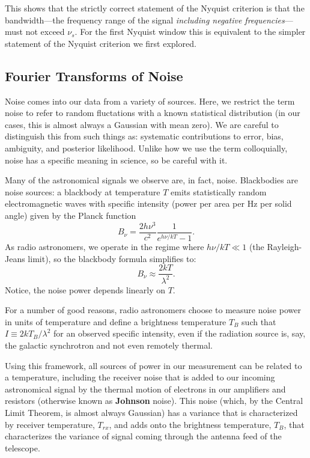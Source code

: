 \documentclass[12pt,preprint]{aastex}
\begin{document}
This shows that the strictly correct statement of the Nyquist criterion
is that the bandwidth---the frequency range of the
signal {\it including negative frequencies}---must not exceed $\nu_s$. For the first Nyquist window this
is equivalent to the simpler statement of the Nyquist criterion we first
explored.

\subsection{Fourier Transforms of Noise}

\noindent
Noise comes into our data from a variety of sources. 
Here, we restrict the term noise to refer to random fluctations with a known statistical distribution (in
our cases, this is almost always a Gaussian with mean zero). We are careful to distinguish
this from such things as: systematic contributions to error, bias, ambiguity, and posterior likelihood.
Unlike how we use the term colloquially, noise has a specific meaning in science, so be careful with it.

Many of the astronomical signals we observe are, in fact, noise. 
Blackbodies are noise sources: a blackbody at temperature $T$ emits statistically 
random electromagnetic waves
with specific intensity (power per area per Hz per solid angle) given by the 
Planck function
\begin{equation}
B_\nu = \frac{2h\nu^3}{c^2}\frac{1}{e^{h\nu/kT}-1}. 
\end{equation}
As radio astronomers, we
operate in the regime where $h\nu/kT \ll 1$ (the Rayleigh-Jeans limit), 
so the blackbody formula simplifies to:
\begin{equation}
B_\nu\approx\frac{2kT}{\lambda^2}. 
\end{equation}
Notice, the noise power depends linearly on $T$. 

For a number of good reasons, radio astronomers choose to measure noise
power in units of temperature and define a brightness temperature
$T_B$ such that $I\equiv2kT_B/\lambda^2$ for an observed specific intensity,
even if the radiation source is, say, the galactic synchrotron and not even remotely thermal.

Using this framework, all sources of power in our measurement can be related to a temperature,
including the receiver noise that is added to our incoming astronomical signal 
by the thermal motion of electrons in our amplifiers and resistors 
(otherwise known as {\bf Johnson} noise).  This noise (which,
by the Central Limit Theorem, is almost always Gaussian) has a variance that
is characterized by receiver temperature, $T_{rx}$, and adds onto the brightness temperature, $T_B$, 
that characterizes the variance of signal coming through the antenna feed of the telescope.
\end{document}

